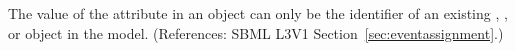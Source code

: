 The value of the attribute  in an \EventAssignment object
can only be the identifier of an existing \Compartment, \Species,
\Parameter or \SpeciesReference object in the model.  (References: SBML
L3V1 Section~\ref{sec:eventassignment}.)
